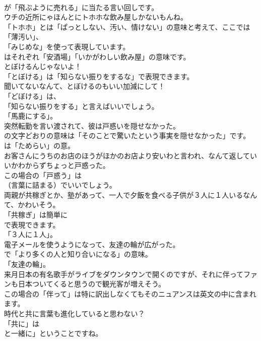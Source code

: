 \documentclass[8pt]{extreport}
\begin{document}
\begin{CJK}{UTF8}{min}
\\	が「飛ぶように売れる」に当たる言い回しです。	
\\	ウチの近所にゃほんとにトホホな飲み屋しかないもんね。 
\\	「トホホ」とは「ぱっとしない、汚い、情けない」の意味と考えて、ここでは
\\	「薄汚い」、
\\	「みじめな」を使って表現しています。
\\	はそれぞれ「安酒場」「いかがわしい飲み屋」の意味です。	
\\	とぼけるんじゃないよ！ 
\\	「とぼける」は「知らない振りをするな」で表現できます。	
\\	聞いてないなんて、とぼけるのもいい加減にして！ 
\\	「どぼける」は、
\\	「知らない振りをする」と言えばいいでしょう。
\\	「馬鹿にする」。	
\\	突然転勤を言い渡されて、彼は戸惑いを隠せなかった。 
\\	の文字どおりの意味は「そのことで驚いたという事実を隠せなかった」です。
\\	は「ためらい」の意。	
\\	お客さんにうちのお店のほうがほかのお店より安いわと言われ、なんて返していいかわからずちょっと戸惑った。 
\\	この場合の「戸惑う」は 
\\	（言葉に詰まる）でいいでしょう。	
\\	両親が共稼ぎとか、塾があって、一人で夕飯を食べる子供が３人に１人いるなんて、かわいそう。 
\\	「共稼ぎ」は簡単に
\\	で表現できます。
\\	「３人に１人」。	
\\	電子メールを使うようになって、友達の輪が広がった。 
\\	で「より多くの人と知り合いになる」の意味。
\\	「友達の輪」。	
\\	来月日本の有名歌手がライブをダウンタウンで開くのですが、それに伴ってファンも日本ついてくると思うので観光客が増えそう。 
\\	この場合の「伴って」は特に訳出しなくてもそのニュアンスは英文の中に含まれます。	
\\	時代と共に言葉も進化していると思わない？ 
\\	「共に」は
\\	と一緒に」ということですね。	

\end{CJK}
\end{document}
